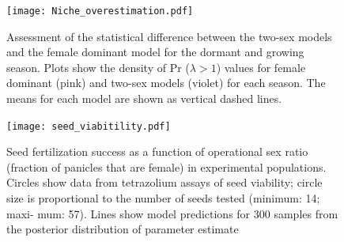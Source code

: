 \documentclass[9pt,twoside,lineno]{pnas-new}
\begin{document}
\begin{figure}
\centering
\texttt{[image: Niche\_overestimation.pdf]}
\caption{ Assessment of the statistical difference between the two-sex models and the female dominant model for the dormant and growing season. 
			Plots show the density of Pr ($\lambda > 1$) values for female dominant (pink) and two-sex models (violet) for each season. 
			The means for each model are shown as vertical dashed lines. }
\label{Sup:Niche_overestimation}
\end{figure}
\clearpage

\begin{figure}
 \centering
  \texttt{[image: seed\_viabitility.pdf]}
  \caption{Seed fertilization success as a function of operational sex ratio (fraction of panicles that are female) in experimental populations. Circles show data from tetrazolium assays of seed viability; circle size is proportional to the number of seeds tested (minimum: 14; maxi- mum: 57). Lines show model predictions  for 300 samples from the posterior distribution of parameter estimate  }
  \label{Sup:seed_ORS}
 \end{figure}
\clearpage
\end{document}
